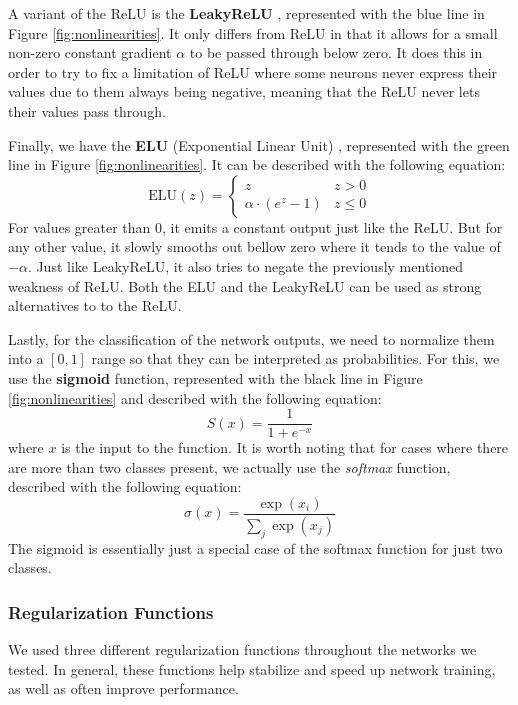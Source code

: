 \documentclass[times, utf8, diplomski, english]{fer_eng}
\begin{document}
A variant of the ReLU is the \textbf{LeakyReLU} \cite{leakyrelu}, represented with the blue line in Figure \ref{fig:nonlinearities}. It only differs from ReLU in that it allows for a small non-zero constant gradient $\alpha$ to be passed through below zero. It does this in order to try to fix a limitation of ReLU where some neurons never express their values due to them always being negative, meaning that the ReLU never lets their values pass through.

Finally, we have the \textbf{ELU} (Exponential Linear Unit) \cite{elu}, represented with the green line in Figure \ref{fig:nonlinearities}. It can be described with the following equation:
\[ \mathrm{ELU}(z) = \begin{cases} 
z & z > 0 \\
\alpha \cdot (e^z - 1) & z \leq 0
\end{cases} \]
For values greater than 0, it emits a constant output just like the ReLU. But for any other value, it slowly smooths out bellow zero where it tends to the value of $- \alpha$. Just like LeakyReLU, it also tries to negate the previously mentioned weakness of ReLU. Both the ELU and the LeakyReLU can be used as strong alternatives to to the ReLU.

Lastly, for the classification of the network outputs, we need to normalize them into a $[0, 1]$ range so that they can be interpreted as probabilities. For this, we use the \textbf{sigmoid} function, represented with the black line in Figure \ref{fig:nonlinearities} and described with the following equation:
\[ S(x) = \frac{1}{1 + e^{-x}} \]
where $x$ is the input to the function. It is worth noting that for cases where there are more than two classes present, we actually use the \textit{softmax} function, described with the following equation:
\[ \sigma(x) = \frac{\exp (x_i)}{\sum_j \exp (x_j)} \]
The sigmoid is essentially just a special case of the softmax function for just two classes.

\subsubsection{Regularization Functions}
\label{subsubsec:regularization functions}

We used three different regularization functions throughout the networks we tested. In general, these functions help stabilize and speed up network training, as well as often improve performance.
\end{document}
